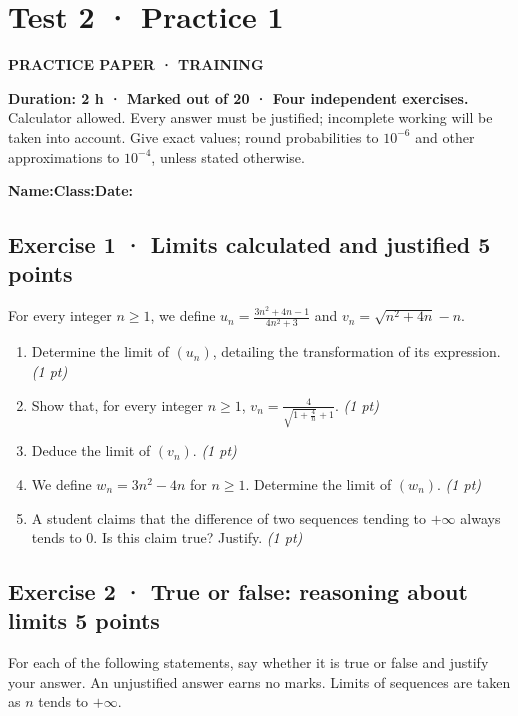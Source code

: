 \clearpage{}\label{sujet:2-1}

\section*{Test 2 · Practice 1}

{\sffamily\bfseries\color{teal}PRACTICE PAPER · TRAINING\par}

\textbf{Duration: 2 h · Marked out of 20 · Four independent exercises.}\\Calculator allowed. Every answer must be justified; incomplete working will be taken into account. Give exact values; round probabilities to $10^{-6}$ and other approximations to $10^{-4}$, unless stated otherwise.

\smallskip\textbf{Name:}\enspace\dotfill\quad\textbf{Class:}\enspace\dotfill\quad\textbf{Date:}\enspace\dotfill

\subsection*{Exercise 1 · Limits calculated and justified \hfill 5 points}For every integer $n\ge1$, we define $u_n=\frac{3n^2+4n-1}{4n^2+3}$ and $v_n=\sqrt{n^2+4n}-n$.

\begin{enumerate}

\item Determine the limit of $(u_n)$, detailing the transformation of its expression. \hfill\textit{(1 pt)}

\item Show that, for every integer $n\ge1$, $v_n=\frac{4}{\sqrt{1+\frac{4}n}+1}$. \hfill\textit{(1 pt)}

\item Deduce the limit of $(v_n)$. \hfill\textit{(1 pt)}

\item We define $w_n=3n^2-4n$ for $n\ge1$. Determine the limit of $(w_n)$. \hfill\textit{(1 pt)}

\item A student claims that the difference of two sequences tending to $+\infty$ always tends to $0$. Is this claim true? Justify. \hfill\textit{(1 pt)}

\end{enumerate}

\subsection*{Exercise 2 · True or false: reasoning about limits \hfill 5 points}For each of the following statements, say whether it is true or false and justify your answer. An unjustified answer earns no marks. Limits of sequences are taken as $n$ tends to $+\infty$.

